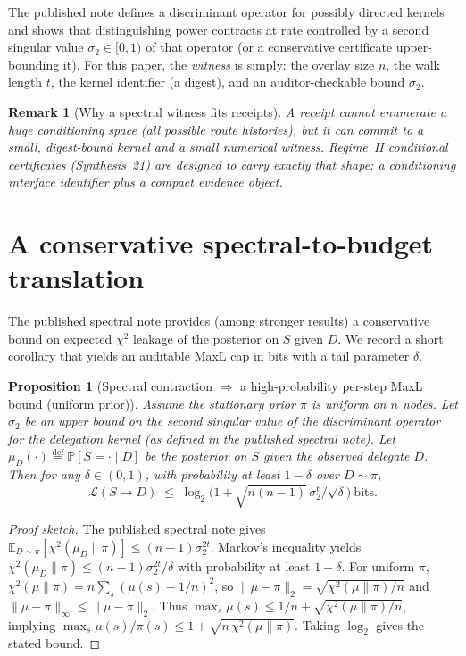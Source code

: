 \documentclass[11pt]{article}
\newtheorem{proposition}{Proposition}
\newtheorem{remark}{Remark}
\newcommand{\PP}{\mathbb{P}}
\newcommand{\EE}{\mathbb{E}}
\newcommand{\defeq}{\stackrel{\mathrm{def}}{=}}
\newcommand{\MaxL}{\mathcal{L}}
\begin{document}
The published note defines a discriminant operator for possibly directed kernels and shows that distinguishing power contracts at rate controlled by a
second singular value $\sigma_2\in[0,1)$ of that operator (or a conservative certificate upper-bounding it).\cite{series:spectral}
For this paper, the \emph{witness} is simply: the overlay size $n$, the walk length $t$, the kernel identifier (a digest), and an auditor-checkable bound $\sigma_2$.

\begin{remark}[Why a spectral witness fits receipts]
A receipt cannot enumerate a huge conditioning space (all possible route histories), but it \emph{can} commit to a small, digest-bound kernel and a small numerical witness.
Regime~II conditional certificates (Synthesis~21) are designed to carry exactly that shape: a conditioning interface identifier plus a compact evidence object.\cite{series:condcert}
\end{remark}


\section{A conservative spectral-to-budget translation}
\label{sec:translation}

The published spectral note provides (among stronger results) a conservative bound on expected $\chi^2$ leakage of the posterior on $S$ given $D$.\cite{series:spectral}
We record a short corollary that yields an auditable MaxL cap in bits with a tail parameter $\delta$.

\begin{proposition}[Spectral contraction $\Rightarrow$ a high-probability per-step MaxL bound (uniform prior)]
\label{prop:spectral-to-maxl}
Assume the stationary prior $\pi$ is uniform on $n$ nodes.
Let $\sigma_2$ be an upper bound on the second singular value of the discriminant operator for the delegation kernel (as defined in the published spectral note).\cite{series:spectral}
Let $\mu_D(\cdot)\defeq \PP[S=\cdot\mid D]$ be the posterior on $S$ given the observed delegate $D$.
Then for any $\delta\in(0,1)$, with probability at least $1-\delta$ over $D\sim\pi$,
\[
\MaxL(S\!\to\!D)
\;\le\;
\log_2\!\Big(1+\sqrt{n(n-1)}\,\sigma_2^{t}/\sqrt{\delta}\Big)\ \text{bits}.
\]
\end{proposition}

\begin{proof}[Proof sketch]
The published spectral note gives
$\EE_{D\sim\pi}\!\left[\chi^2(\mu_D\|\pi)\right]\le (n-1)\sigma_2^{2t}$.\cite{series:spectral}
Markov's inequality yields $\chi^2(\mu_D\|\pi)\le (n-1)\sigma_2^{2t}/\delta$ with probability at least $1-\delta$.
For uniform $\pi$, $\chi^2(\mu\|\pi)=n\sum_s(\mu(s)-1/n)^2$, so
$\|\mu-\pi\|_2 = \sqrt{\chi^2(\mu\|\pi)/n}$ and $\|\mu-\pi\|_\infty\le \|\mu-\pi\|_2$.
Thus $\max_s \mu(s)\le 1/n+\sqrt{\chi^2(\mu\|\pi)/n}$, implying
$\max_s \mu(s)/\pi(s)\le 1+\sqrt{n\,\chi^2(\mu\|\pi)}$.
Taking $\log_2$ gives the stated bound.
\end{proof}
\end{document}
